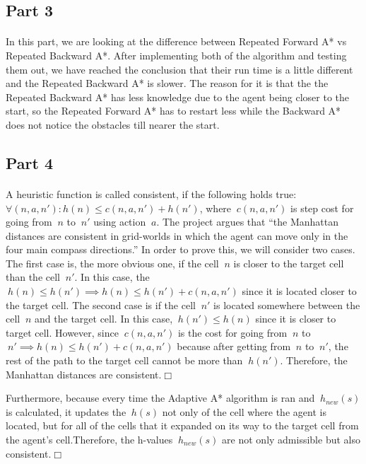 \documentclass{article}
\begin{document}
\subsection*{Part 3}
\paragraph*{}
In this part, we are looking at the difference between Repeated Forward A* vs Repeated Backward A*. After implementing both of the algorithm and testing them out, we have reached the conclusion that their run time is a little different and the Repeated Backward A* is slower. The reason for it is that the the Repeated Backward A* has less knowledge due to the agent being closer to the start, so the Repeated Forward A* has to restart less while the Backward A* does not notice the obstacles till nearer the start.\par

\subsection*{Part 4}
\paragraph*{}
A heuristic function is called consistent, if the following holds true: $\forall (n,a,n'): h (n)\leq c(n,a,n')+h(n')$, where $\ c(n,a,n')$ is step cost for going from $\ n$ to $\ n'$ using action $\ a$. The project argues that “the Manhattan distances are consistent in grid-worlds in which the agent can move only in the four main compass directions.” In order to prove this, we will consider two cases. The first case is, the more obvious one, if the cell $\ n$ is closer to the target cell than the cell $\ n'$. In this case, the $\ h(n) \leq h(n') \implies h(n) \leq h(n')+c(n,a,n')$ since it is located closer to the target cell. The second case is if the cell $\ n'$ is located somewhere between the cell $\ n$ and the target cell. In this case, $\ h(n') \leq h(n)$ since it is closer to target cell. However, since $\ c(n,a,n')$ is the cost for going from $\ n$ to $\ n' \implies h(n) \leq h(n')+c(n,a,n')$ because after getting from $\ n$ to $\ n'$, the rest of the path to the target cell cannot be more than $\ h(n')$. Therefore, the Manhattan distances are consistent.$\Box$\par
Furthermore, because every time the Adaptive A* algorithm is ran and $\ h_{new}(s)$ is calculated, it updates the $\ h(s)$ not only of the cell where the agent is located, but for all of the cells that it expanded on its way to the target cell from the agent's cell.Therefore, the h-values $\ h_{new}(s)$ are not only admissible but also consistent.$\Box$\par
\end{document}
